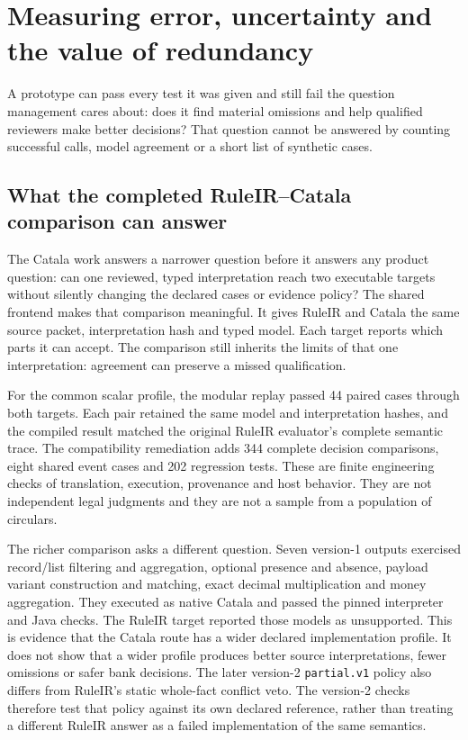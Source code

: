 \chapter{Measuring error, uncertainty and the value of redundancy}
\label{ch:evaluation}

A prototype can pass every test it was given and still fail the question
management cares about: does it find material omissions and help qualified
reviewers make better decisions? That question cannot be answered by counting
successful calls, model agreement or a short list of synthetic cases.

\section{What the completed RuleIR--Catala comparison can answer}
\label{sec:evaluation-catala-comparison}

The Catala work answers a narrower question before it answers any product
question: can one reviewed, typed interpretation reach two executable targets
without silently changing the declared cases or evidence policy? The shared
frontend makes that comparison meaningful. It gives RuleIR and Catala the same
source packet, interpretation hash and typed model. Each target reports which
parts it can accept.
The comparison still inherits the limits of that one interpretation: agreement
can preserve a missed qualification.

For the common scalar profile, the modular replay passed 44 paired cases through
both targets. Each pair retained the same model and interpretation hashes, and
the compiled result matched the original RuleIR evaluator's complete semantic
trace. The compatibility remediation adds 344 complete decision comparisons,
eight shared event cases and 202 regression tests. These are finite engineering
checks of translation, execution, provenance and host behavior. They are not
independent legal judgments and they are not a sample from a population of
circulars.

The richer comparison asks a different question. Seven version-1 outputs
exercised record/list filtering and aggregation, optional presence and absence,
payload variant construction and matching, exact decimal multiplication and
money aggregation. They executed as native Catala and passed the pinned
interpreter and Java checks. The RuleIR target reported those models
as unsupported. This is evidence that the Catala route has a wider declared
implementation profile. It does not show that a wider profile produces better
source interpretations, fewer omissions or safer bank decisions. The
later version-2 \texttt{partial.v1} policy also differs from RuleIR's static
whole-fact conflict veto. The version-2 checks therefore test that policy
against its own declared reference, rather than treating a different RuleIR
answer as a failed implementation of the same semantics.

